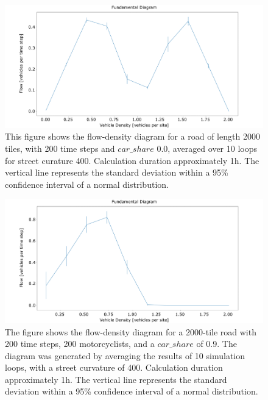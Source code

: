 \begin{figure}
	\centering
	\includegraphics[width=1.0\linewidth]{images/flow_density401_full_bike.png}
	\caption{This figure shows the flow-density diagram for a road of length 2000 tiles, with 200 time steps and $car\_share$ 0.0, averaged over 10 loops for street curature 400. Calculation duration approximately 1h. The vertical line represents the standard deviation within a 95\% confidence interval of a normal distribution.}
	\label{fig:flow_density401_full_bike}
\end{figure}

\begin{figure}
    \centering
    \includegraphics[width=1.0\linewidth]{images/flow_density401_more_bikers.png}
    \caption{The figure shows the flow-density diagram for a 2000-tile road with 200 time steps, 200 motorcyclists, and a $car\_share$ of 0.9. The diagram was generated by averaging the results of 10 simulation loops, with a street curvature of 400. Calculation duration approximately 1h. The vertical line represents the standard deviation within a 95\% confidence interval of a normal distribution.}
    \label{fig:flow_density401_more_bikers.png}
\end{figure}





